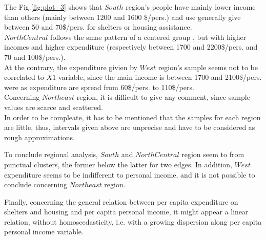 \documentclass[12pt,letterpaper]{article}
\begin{document}
The Fig.\ref{fig:plot_3} shows that $South$ region's people have mainly lower income than others (mainly between  1200 and 1600 \$/pers.) and use generally give between 50 and 70\$/pers. for shelters or housing assistance. \\
$North Central$ follows the smae pattern of a centered group , but with higher incomes and higher expenditure (respectively between 1700 and 2200\$/pers. and 70 and 100\$/pers.). \\
At the contrary, the expenditure givien by $West$ region's sample seems not to be correlated to $X1$ variable, since the main income is between 1700 and 2100\$/pers. were as expenditure are spread from 60\$/pers. to 110\$/pers.  \\
Concerning $Northeast$ region, it is difficult to give any comment, since sample values are scarce and scattered. \\

In order to be compleate, it has to be mentioned that the samples for each region are little, thus, intervals given above are unprecise and have to be considered as rough approximations.

To conclude regional analysis, $South$ and $North Central$ region seem to from punctual clusters, the former below the latter for two edges. In addition, $West$ expenditure seems to be indifferent to personal income, and it is not possible to conclude concerning $Northeast$ region.

Finally, concerning the general relation between per capita expenditure on shelters and housing and per capita personal income, it might appear a linear relation, without homoscedasticity, i.e. with a growing dispersion along per capita personal income variable.
\end{document}
